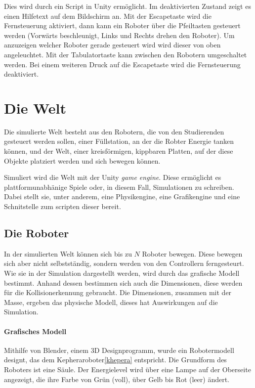 Dies wird durch ein Script in Unity erm{\"{o}}glicht. Im deaktivierten Zustand zeigt es einen Hilfetext auf dem Bildschirm an. Mit der Escapetaste wird die Fernsteuerung aktiviert, dann kann ein
Roboter {\"{u}}ber die Pfeiltasten gesteuert werden (Vorw{\"{a}}rts beschleunigt, Links und Rechts drehen den Roboter).
Um anzuzeigen welcher Roboter gerade gesteuert wird wird dieser von oben angeleuchtet. Mit der Tabulatortaste kann zwischen den
Robotern umgeschaltet werden. Bei einem weiteren Druck auf die Escapetaste wird die Fernsteuerung deaktiviert.


\clearpage
\section{Die Welt}
Die simulierte Welt besteht aus den Robotern, die von den Studierenden gesteuert werden sollen, einer F{\"{u}}llstation, an der die Robter Energie tanken k{\"{o}}nnen, und
der Welt, einer kreisf{\"{o}}rmigen, kippbaren Platten, auf der diese Objekte platziert werden und sich bewegen k{\"{o}}nnen.

Simuliert wird die Welt mit der Unity \textit{game engine}. Diese erm{\"{o}}glicht es plattformunabh{\"{a}}nige Spiele oder, in diesem Fall, Simulationen zu schreiben.
Dabei stellt sie, unter anderem, eine Physikengine, eine Grafikengine und eine Schnitstelle zum scripten dieser bereit. 

\subsection{Die Roboter}\label{robot}
In der simulierten Welt k{\"{o}}nnen sich bis zu $N$ Roboter bewegen. Diese bewegen sich aber nicht selbstst{\"{a}}ndig, sondern werden von den Controllern ferngesteurt.
Wie sie in der Simulation dargestellt werden, wird durch das grafische Modell bestimmt. Anhand dessen bestimmen sich auch die Dimensionen, diese werden f{\"{u}}r die Kollisionerkennung
gebraucht. Die Dimensionen, zusammen mit der Masse, ergeben das physische Modell, dieses hat Auswirkungen auf die Simulation.

\paragraph{Grafisches Modell} Mithilfe von Blender, einem 3D Designprogramm, wurde ein Robotermodell designt, das dem Kepheraroboter\ref{khepera} entspricht. Die Grundform des Roboters ist
eine S{\"{a}}ule.
Der Energielevel wird {\"{u}}ber eine Lampe auf der Oberseite angezeigt, die ihre
Farbe von Gr{\"{u}}n (voll), {\"{u}}ber Gelb bis Rot (leer) {\"{a}}ndert.


